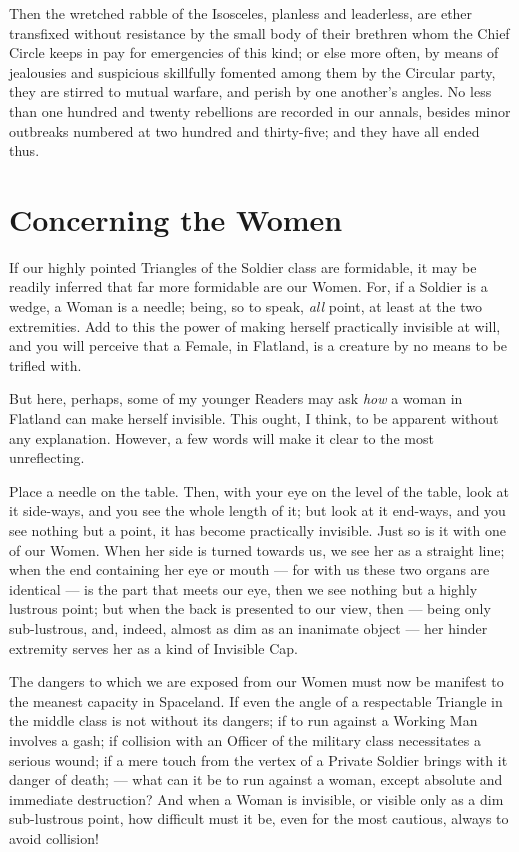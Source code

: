 \documentclass[10pt, kindle, oneside]{kindle}
\begin{document}
Then the wretched rabble of the Isosceles, planless and leaderless, are ether
transfixed without resistance by the small body of their brethren whom the
Chief Circle keeps in pay for emergencies of this kind; or else more often, by
means of jealousies and suspicious skillfully fomented among them by the
Circular party, they are stirred to mutual warfare, and perish by one
another's angles. No less than one hundred and twenty rebellions are recorded
in our annals, besides minor outbreaks numbered at two hundred and
thirty-five; and they have all ended thus.


\chapter{Concerning the Women}


If our highly pointed Triangles of the Soldier class are formidable, it may be
readily inferred that far more formidable are our Women. For, if a Soldier is
a wedge, a Woman is a needle; being, so to speak, \emph{all} point, at least at the
two extremities. Add to this the power of making herself practically invisible
at will, and you will perceive that a Female, in Flatland, is a creature by no
means to be trifled with.

But here, perhaps, some of my younger Readers may ask \emph{how} a woman in Flatland
can make herself invisible. This ought, I think, to be apparent without any
explanation. However, a few words will make it clear to the most unreflecting.

Place a needle on the table. Then, with your eye on the level of the table,
look at it side-ways, and you see the whole length of it; but look at it
end-ways, and you see nothing but a point, it has become practically
invisible. Just so is it with one of our Women. When her side is turned
towards us, we see her as a straight line; when the end containing her eye or
mouth --- for with us these two organs are identical --- is the part that meets
our eye, then we see nothing but a highly lustrous point; but when the back is
presented to our view, then --- being only sub-lustrous, and, indeed, almost as
dim as an inanimate object --- her hinder extremity serves her as a kind of
Invisible Cap.

The dangers to which we are exposed from our Women must now be manifest to the
meanest capacity in Spaceland. If even the angle of a respectable Triangle in
the middle class is not without its dangers; if to run against a Working Man
involves a gash; if collision with an Officer of the military class
necessitates a serious wound; if a mere touch from the vertex of a Private
Soldier brings with it danger of death; --- what can it be to run against a
woman, except absolute and immediate destruction? And when a Woman is
invisible, or visible only as a dim sub-lustrous point, how difficult must it
be, even for the most cautious, always to avoid collision!
\end{document}
